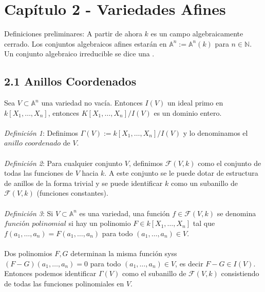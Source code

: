 \documentclass{article}
\newcommand{\A}{\mathbb{A}}
\begin{document}
\section*{Capítulo 2 - Variedades Afines}
Definiciones preliminares: A partir de ahora $k$ es un campo algebraicamente cerrado. Los conjuntos algebraicos afines estarán en $\A^n := \A^{n}(k)$ para $n \in \mathbb{N}$. Un conjunto algebraico irreducible se dice una .
\subsection*{2.1 Anillos Coordenados}
Sea $V \subset \A^n$ una variedad no vacía. Entonces $I(V)$ un ideal primo en $k[X_1,\dots,X_n]$, entonces $K[X_1, \dots, X_n]/I(V)$ es un dominio entero.
\\
\\
\textit{Definición 1}: Definimos $\Gamma(V):=k[X_1, \dots, X_n]/I(V)$ y lo denominamos el $\textit{anillo coordenado}$ de $V$.
\\
\\
\textit{Definición 2}: Para cualquier conjunto $V$, definimos $\mathcal{F}(V,k)$ como el conjunto de todas las funciones de $V$ hacia $k$. A este conjunto se le puede dotar de estructura de anillos de la forma trivial y se puede identificar $k$ como un subanillo de $\mathcal{F}(V,k)$ (funciones constantes).
\\
\\
\textit{Definición 3}: Si $V \subset \A^{n}$ es una variedad, una función $f \in \mathcal{F}(V,k)$ se denomina $\textit{función polinomial}$ si hay un polinomio $F \in k[X_1,\dots,X_n]$ tal que $f(a_1,\dots,a_n)=F(a_1,\dots,a_n)$ para todo $(a_1,\dots,a_n) \in V$.
\\
\\
Dos polinomios $F,G$ determinan la misma función syss $(F-G)(a_1,\dots,a_n)=0$ para todo $(a_1,\dots,a_n) \in V$, es decir $F-G \in I(V)$. Entonces podemos identificar $\Gamma(V)$ como el subanillo de $\mathcal{F}(V,k)$ consistiendo de todas las funciones polinomiales en $V$.
\end{document}
